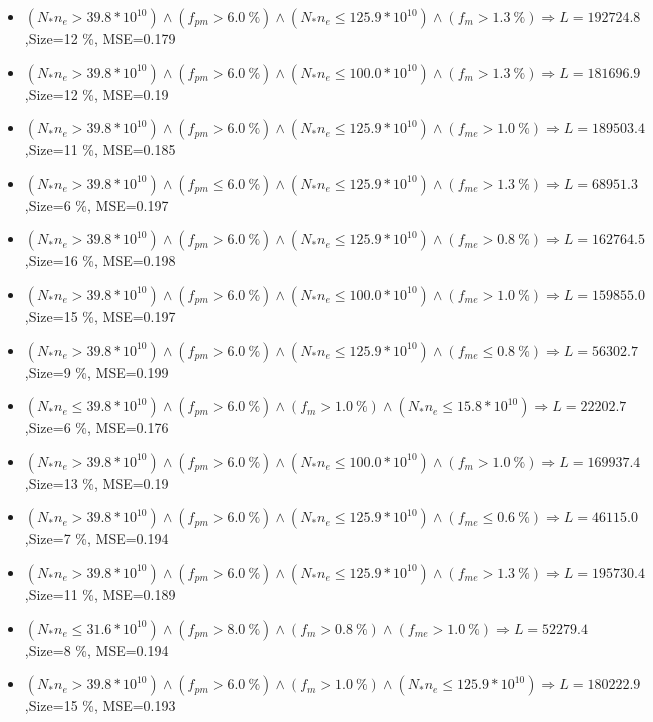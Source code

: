 \documentclass[numbered]{CSL}
\begin{document}
\begin{itemize}
\item $(N_* n_e > 39.8 * 10^{10}) \land (f_{pm} > 6.0~\%) \land (N_* n_e \leq 125.9 * 10^{10}) \land (f_m > 1.3~\%) \Rightarrow L = 192724.8$,\hfill Size=12 \%, MSE=0.179
\item $(N_* n_e > 39.8 * 10^{10}) \land (f_{pm} > 6.0~\%) \land (N_* n_e \leq 100.0 * 10^{10}) \land (f_m > 1.3~\%) \Rightarrow L = 181696.9$,\hfill Size=12 \%, MSE=0.19
\item $(N_* n_e > 39.8 * 10^{10}) \land (f_{pm} > 6.0~\%) \land (N_* n_e \leq 125.9 * 10^{10}) \land (f_{me} > 1.0~\%) \Rightarrow L = 189503.4$,\hfill Size=11 \%, MSE=0.185
\item $(N_* n_e > 39.8 * 10^{10}) \land (f_{pm} \leq 6.0~\%) \land (N_* n_e \leq 125.9 * 10^{10}) \land (f_{me} > 1.3~\%) \Rightarrow L = 68951.3$,\hfill Size=6 \%, MSE=0.197
\item $(N_* n_e > 39.8 * 10^{10}) \land (f_{pm} > 6.0~\%) \land (N_* n_e \leq 125.9 * 10^{10}) \land (f_{me} > 0.8~\%) \Rightarrow L = 162764.5$,\hfill Size=16 \%, MSE=0.198
\item $(N_* n_e > 39.8 * 10^{10}) \land (f_{pm} > 6.0~\%) \land (N_* n_e \leq 100.0 * 10^{10}) \land (f_{me} > 1.0~\%) \Rightarrow L = 159855.0$,\hfill Size=15 \%, MSE=0.197
\item $(N_* n_e > 39.8 * 10^{10}) \land (f_{pm} > 6.0~\%) \land (N_* n_e \leq 125.9 * 10^{10}) \land (f_{me} \leq 0.8~\%) \Rightarrow L = 56302.7$,\hfill Size=9 \%, MSE=0.199
\item $(N_* n_e \leq 39.8 * 10^{10}) \land (f_{pm} > 6.0~\%) \land (f_m > 1.0~\%) \land (N_* n_e \leq 15.8 * 10^{10}) \Rightarrow L = 22202.7$,\hfill Size=6 \%, MSE=0.176
\item $(N_* n_e > 39.8 * 10^{10}) \land (f_{pm} > 6.0~\%) \land (N_* n_e \leq 100.0 * 10^{10}) \land (f_m > 1.0~\%) \Rightarrow L = 169937.4$,\hfill Size=13 \%, MSE=0.19
\item $(N_* n_e > 39.8 * 10^{10}) \land (f_{pm} > 6.0~\%) \land (N_* n_e \leq 125.9 * 10^{10}) \land (f_{me} \leq 0.6~\%) \Rightarrow L = 46115.0$,\hfill Size=7 \%, MSE=0.194
\item $(N_* n_e > 39.8 * 10^{10}) \land (f_{pm} > 6.0~\%) \land (N_* n_e \leq 125.9 * 10^{10}) \land (f_{me} > 1.3~\%) \Rightarrow L = 195730.4$,\hfill Size=11 \%, MSE=0.189
\item $(N_* n_e \leq 31.6 * 10^{10}) \land (f_{pm} > 8.0~\%) \land (f_m > 0.8~\%) \land (f_{me} > 1.0~\%) \Rightarrow L = 52279.4$,\hfill Size=8 \%, MSE=0.194
\item $(N_* n_e > 39.8 * 10^{10}) \land (f_{pm} > 6.0~\%) \land (f_m > 1.0~\%) \land (N_* n_e \leq 125.9 * 10^{10}) \Rightarrow L = 180222.9$,\hfill Size=15 \%, MSE=0.193

\end{itemize}
\end{document}
